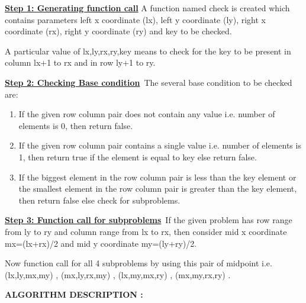 \documentclass[14pt]{article}
\renewcommand{\_}{\kern-1.5pt\textunderscore\kern-1.5pt}
\begin{document}
\begin{multicols}{2}
\begin{enumerate}
\vspace{\baselineskip}
\begin{justify}
\textbf{\uline{Step 1: Generating function call}} A function named check is created which contains parameters left x coordinate (lx), left y coordinate (ly), right x coordinate (rx), right y coordinate (ry) and key to be checked.
\end{justify}
\begin{justify}
A particular value of lx,ly,rx,ry,key means to check for the key to be present in column lx+1 to rx and in row ly+1 to ry.
\end{justify}

\vspace{\baselineskip}
\begin{justify}
\textbf{\uline{Step 2: Checking Base condition}}\  The several base condition to be checked are:
\end{justify}
\begin{enumerate}
	\item If the given row column pair does not contain any value i.e. number of elements is 0, then return false.
	\item  If the given row column pair contains a single value i.e. number of elements is 1, then return true if the element is equal to key else return false.
	\item If the biggest element in the row column pair is less than the key element or the smallest element in the row column pair is greater than the key element, then return false else check for subproblems.
\end{enumerate}

\vspace{\baselineskip}
\begin{justify}
\textbf{\uline{Step 3: Function call for subproblems}}\  If the given problem has row range from ly to ry and column range from lx to rx, then consider mid x coordinate mx=(lx+rx)/2 and mid y coordinate my=(ly+ry)/2.
\end{justify}
\begin{justify}
Now function call for all 4 subproblems by using this pair of midpoint i.e. (lx,ly,mx,my) , (mx,ly,rx,my) , (lx,my,mx,ry) , (mx,my,rx,ry) .
\end{justify}

\vspace{\baselineskip}

\vspace{\baselineskip}
\begin{justify}
{\fontsize{12pt}{14.4pt}\selectfont \textbf{ALGORITHM DESCRIPTION :}}
\end{justify}


\end{enumerate}
\end{multicols}
\end{document}
